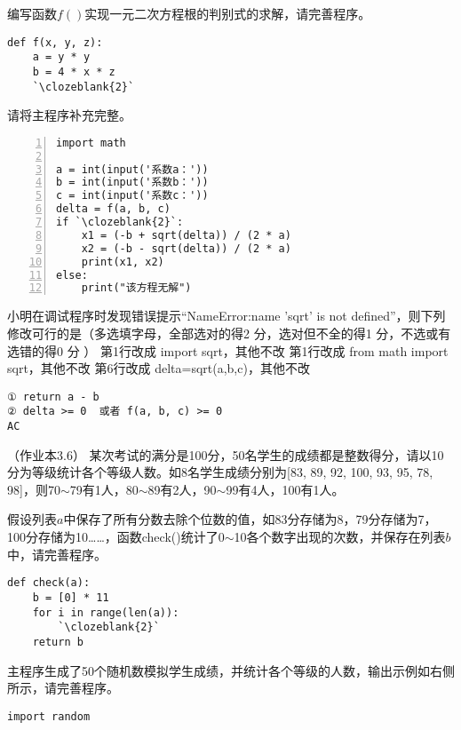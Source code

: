 \begin{groups}
\begin{questions}[rp]
\begin{subquestions}
\subquestion 编写函数$f()$实现一元二次方程根的判别式的求解，请完善程序。
\begin{lstlisting}
def f(x, y, z):
    a = y * y
    b = 4 * x * z
    `\clozeblank{2}`
\end{lstlisting}

\subquestion 请将主程序补充完整。
\begin{lstlisting}[numbers=left]
import math

a = int(input('系数a：'))
b = int(input('系数b：'))
c = int(input('系数c：'))
delta = f(a, b, c)
if `\clozeblank{2}`:
    x1 = (-b + sqrt(delta)) / (2 * a)
    x2 = (-b - sqrt(delta)) / (2 * a)
    print(x1, x2)
else:
    print("该方程无解")
\end{lstlisting}

\subquestion 小明在调试程序时发现错误提示“NameError:name 'sqrt' is not defined”，则下列修改可行的是（{\kaishu 多选填字母，全部选对的得2 分，选对但不全的得1 分，不选或有选错的得0 分 }）
{第1行改成 import sqrt，其他不改}
{第1行改成 from math import sqrt，其他不改}
{第6行改成 delta=sqrt(a,b,c)，其他不改}
\end{subquestions}

\begin{solution}
\begin{lstlisting}
① return a - b
② delta >= 0  或者 f(a, b, c) >= 0
AC
\end{lstlisting}
\end{solution}


\setcounter{qnumber}{1}
\question （{\kaishu 作业本3.6}）
某次考试的满分是100分，50名学生的成绩都是整数得分，请以10分为等级统计各个等级人数。如8名学生成绩分别为[83, 89, 92, 100, 93, 95, 78, 98]，则70$\sim$79有1人，80$\sim$89有2人，90$\sim$99有4人，100有1人。

\begin{subquestions}
\subquestion 假设列表$a$中保存了所有分数去除个位数的值，如83分存储为8，79分存储为7，100分存储为10……，函数check()统计了0$\sim$10各个数字出现的次数，并保存在列表$b$中，请完善程序。
\begin{lstlisting}
def check(a):
    b = [0] * 11
    for i in range(len(a)):
        `\clozeblank{2}`
    return b
\end{lstlisting}

\subquestion 主程序生成了50个随机数模拟学生成绩，并统计各个等级的人数，输出示例如右侧所示，请完善程序。
\begin{paracol}{2}
\begin{lstlisting}
import random


\end{lstlisting}
\end{paracol}
\end{subquestions}
\end{questions}
\end{groups}
